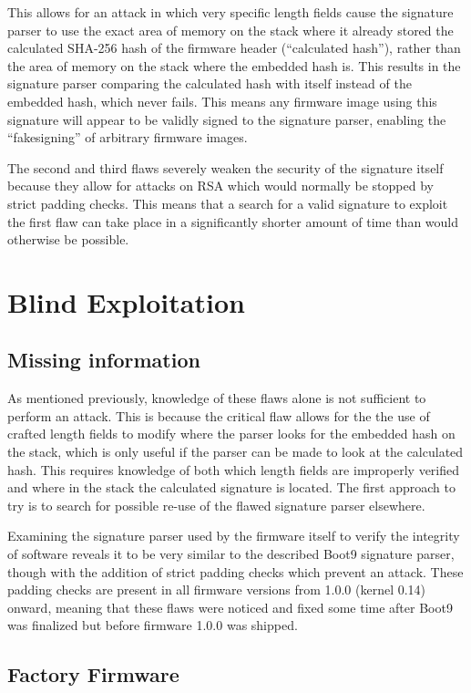 \documentclass[journal]{IEEEtran}
\begin{document}
This allows for an attack in which very specific length fields cause the
signature parser to use the exact area of memory on the stack where it already
stored the calculated SHA-256 hash of the firmware header (``calculated hash''),
rather than the area of memory on the stack where the embedded hash is. This
results in the signature parser comparing the calculated hash with itself
instead of the embedded hash, which never fails. This means any firmware image
using this signature will appear to be validly signed to the signature parser,
enabling the ``fakesigning'' of arbitrary firmware images.

The second and third flaws severely weaken the security of the signature itself
because they allow for attacks on RSA which would normally be stopped by strict
padding checks. This means that a search for a valid signature to exploit the
first flaw can take place in a significantly shorter amount of time than would
otherwise be possible.

\section{Blind Exploitation}

\subsection{Missing information}

As mentioned previously, knowledge of these flaws alone is not sufficient to
perform an attack. This is because the critical flaw allows for the the use of
crafted length fields to modify where the parser looks for the embedded hash on
the stack, which is only useful if the parser can be made to look at the
calculated hash. This requires knowledge of both which length fields are
improperly verified and where in the stack the calculated signature is located.
The first approach to try is to search for possible re-use of the flawed
signature parser elsewhere.

Examining the signature parser used by the firmware itself to verify the
integrity of software reveals it to be very similar to the described Boot9
signature parser, though with the addition of strict padding checks which
prevent an attack. These padding checks are present in all firmware versions
from 1.0.0 (kernel 0.14) onward, meaning that these flaws were noticed and fixed
some time after Boot9 was finalized but before firmware 1.0.0 was shipped.

\subsection{Factory Firmware}
\end{document}
